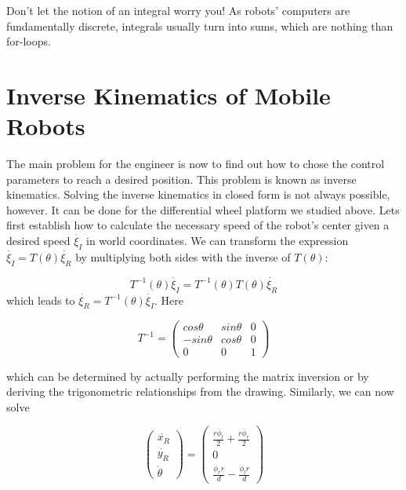 \begin{framed}
Don't let the notion of an integral worry you! As robots' computers are fundamentally discrete, integrals usually turn into sums, which are nothing than for-loops.
\end{framed}

\section{Inverse Kinematics of Mobile Robots}\label{sec:ivkmobile}
The main problem for the engineer is now to find out how to chose the control parameters to reach a desired position. This problem is known as inverse kinematics. Solving the inverse kinematics in closed form is not always possible, however. It can be done for the differential wheel platform we studied above. Lets first establish how to calculate the necessary speed of the robot's center given a desired speed $ \dot{\xi_I}$ in world coordinates. We can transform the expression $ \dot{\xi_I}=T(\theta)\dot{\xi_R}$ by multiplying both sides with the inverse of $ T(\theta)$:

\begin{equation}\label{eq:mbik}
T^{-1}(\theta)\dot{\xi_I}=T^{-1}(\theta)T(\theta)\dot{\xi_R}
\end{equation}
which leads to $ \dot{\xi_R}=T^{-1}(\theta)\dot{\xi_I}$. Here

\begin{equation}
T^{-1}=\left(\begin{array}{ccc}cos \theta & sin \theta & 0 \\ -sin \theta & cos \theta & 0 \\ 0 & 0 & 1\end{array}\right)
\end{equation}

which can be determined by actually performing the matrix inversion or by deriving the trigonometric relationships from the drawing.  Similarly, we can now solve

\begin{equation}
\left(\begin{array}{c} \dot{x_R}\\\dot{y_R}\\\dot{\theta}\end{array}\right)=\left(\begin{array}{c}\frac{r\dot{\phi_l}}{2}+\frac{r\dot{\phi_r}}{2}\\0\\\frac{\dot{\phi_r} r}{d}-\frac{\dot{\phi_l} r}{d}\end{array}\right)
\end{equation}

